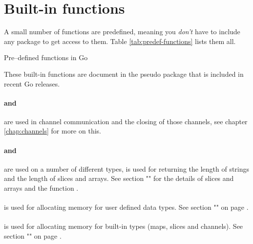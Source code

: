 \section{Built-in functions}
A small number of functions are predefined, meaning 
you \emph{don't} have to include any package to get
access to them. Table \ref{tab:predef-functions} lists them all.

\begin{table}[H]
\begin{center}
\caption{Pre--defined functions in Go}
\label{tab:predef-functions}

\end{center}
\end{table}

These built-in functions are document in the  
pseudo package that is included in recent Go releases.

\paragraph{ and } are used in
channel communication and the closing of those channels, see chapter \ref{chap:channels}
for more on this.

\paragraph{ and } are used on a number of different
types,  is
used for returning the length of strings and the length of slices and
arrays. See section "" for the details of slices and
arrays and the function
.

\paragraph{} is used for allocating memory for user defined
data types. See section "" on page
\pageref{sec:allocation with new}.

\paragraph{} is used for allocating memory for built-in
types (maps, slices and channels). See section 
"" on page
\pageref{sec:allocation with make}.

